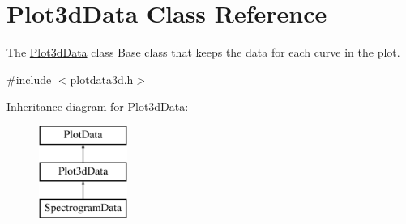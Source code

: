 \hypertarget{class_plot3d_data}{\section{\-Plot3d\-Data \-Class \-Reference}
\label{class_plot3d_data}
}


\-The \hyperlink{class_plot3d_data}{\-Plot3d\-Data} class \-Base class that keeps the data for each curve in the plot.  




{\ttfamily \#include $<$plotdata3d.\-h$>$}

\-Inheritance diagram for \-Plot3d\-Data\-:\begin{figure}[H]
\begin{center}
\leavevmode
\includegraphics[height=3.000000cm]{class_plot3d_data}
\end{center}
\end{figure}
